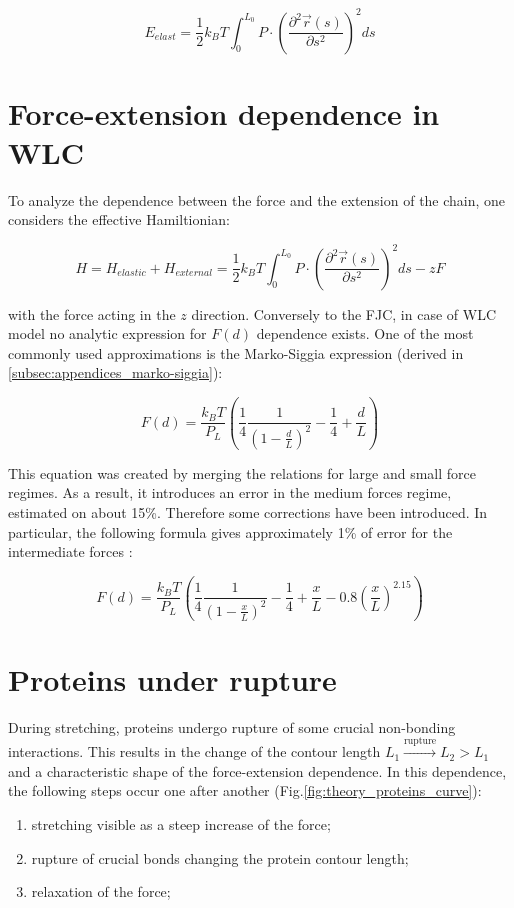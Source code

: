 \begin{equation}
    \boxed{E_{elast}={\frac {1}{2}}k_{B}T\int _{0}^{L_{0}}P\cdot \left({\frac {\partial ^{2}{\vec {r}}(s)}{\partial s^{2}}}\right)^{2}ds}
\end{equation}

\section{Force-extension dependence in WLC}
\label{sec:theory_fd}
To analyze the dependence between the force and the extension of the chain, one considers the effective Hamiltionian:

\begin{equation}
    H=H_{elastic}+H_{external}={\frac {1}{2}}k_{B}T\int _{0}^{L_{0}}P\cdot \left({\frac {\partial ^{2}{\vec {r}}(s)}{\partial s^{2}}}\right)^{2}ds - zF
\end{equation}

with the force acting in the $z$ direction. Conversely to the FJC, in case of WLC model no analytic expression for $F(d)$ dependence exists.
One of the most commonly used approximations is the Marko-Siggia expression \cite{marko1995statistical} (derived in \ref{subsec:appendices_marko-siggia}):

\begin{equation}
    \boxed{F(d)=\frac{k_BT}{P_L}\left({\frac {1}{4}}\frac{1}{(1-{\frac {d}{L}})^{2}}-{\frac {1}{4}}+{\frac {d}{L}}\right)}
\end{equation}

This equation was created by merging the relations for large and small force regimes.
As a result, it introduces an error in the medium forces regime, estimated on about 15\%.
Therefore some corrections have been introduced. In particular, the following formula gives approximately 1\% of error for the intermediate forces \cite{petrosyan2017improved}:

\begin{equation}
    F(d)=\frac{k_BT}{P_L}\left({\frac {1}{4}}\frac{1}{(1-\frac {x}{L})^{2}}-{\frac {1}{4}}+{\frac {x}{L}}-0.8\left({\frac {x}{L}}\right)^{2.15}\right)
\end{equation}

\section{Proteins under rupture}
\label{sec:theory_proteins}
During stretching, proteins undergo rupture of some crucial non-bonding interactions.
This results in the change of the contour length $L_1 \xrightarrow{\text{rupture}} L_2 > L_1$ and a characteristic shape of the force-extension dependence.
In this dependence, the following steps occur one after another (Fig.\ref{fig:theory_proteins_curve}):
\begin{enumerate}
    \item stretching visible as a steep increase of the force;
    \item rupture of crucial bonds changing the protein contour length;
    \item relaxation of the force;
\end{enumerate}

